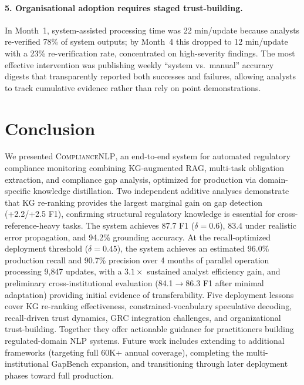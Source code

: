\documentclass[11pt]{article}
\begin{document}
\paragraph{5. Organisational adoption requires staged trust-building.} In Month~1, system-assisted processing time was 22 min/update because analysts re-verified 78\% of system outputs; by Month~4 this dropped to 12 min/update with a 23\% re-verification rate, concentrated on high-severity findings. The most effective intervention was publishing weekly ``system vs.\ manual'' accuracy digests that transparently reported both successes and failures, allowing analysts to track cumulative evidence rather than rely on point demonstrations.

\section{Conclusion}
\label{sec:conclusion}

We presented \textsc{ComplianceNLP}, an end-to-end system for automated regulatory compliance monitoring combining KG-augmented RAG, multi-task obligation extraction, and compliance gap analysis, optimized for production via domain-specific knowledge distillation. Two independent additive analyses demonstrate that KG re-ranking provides the largest marginal gain on gap detection (+2.2/+2.5 F1), confirming structural regulatory knowledge is essential for cross-reference-heavy tasks. The system achieves 87.7 F1 ($\delta{=}0.6$), 83.4 under realistic error propagation, and 94.2\% grounding accuracy. At the recall-optimized deployment threshold ($\delta{=}0.45$), the system achieves an estimated 96.0\% production recall and 90.7\% precision over 4 months of parallel operation processing 9{,}847 updates, with a $3.1\times$ sustained analyst efficiency gain, and preliminary cross-institutional evaluation (84.1$\to$86.3 F1 after minimal adaptation) providing initial evidence of transferability. Five deployment lessons cover KG re-ranking effectiveness, constrained-vocabulary speculative decoding, recall-driven trust dynamics, GRC integration challenges, and organizational trust-building. Together they offer actionable guidance for practitioners building regulated-domain NLP systems. Future work includes extending to additional frameworks (targeting full 60K+ annual coverage), completing the multi-institutional GapBench expansion, and transitioning through later deployment phases toward full production.
\end{document}
